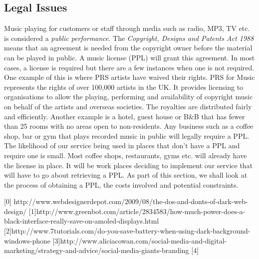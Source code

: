 \subsection{\textbf{Legal Issues}}
    Music playing for customers or staff through media such as radio, MP3, TV etc. is considered a \emph{public performance}. The \emph{Copyright, Designs and Patents Act 1988} means that an agreement is needed from the copyright owner before the material can be played in public. A music license (PPL) will grant this agreement. In most cases, a license is required but there are a few instances when one is not required. One example of this is where PRS  artists have waived their rights. PRS for Music represents the rights of over 100,000 artists in the UK.  It provides licensing to organisations to allow the playing, performing and availability of copyright music on behalf of the artists and overseas societies.  The royalties are distributed fairly and efficiently.  Another example is a hotel, guest house or B\&B that has fewer than 25 rooms with no areas open to non-residents. 
    Any business such as a coffee shop, bar or gym that plays recorded music in public will legally require a PPL. The likelihood of our service being used in places that don't have a PPL and require one is small. Most coffee shops, restaurants, gyms etc. will already have the license in place. It will be work places deciding to implement our service that will have to go about retrieving a PPL. As part of this section, we shall look at the process of obtaining a PPL, the costs involved and potential constraints.
    
    
    
    
    
    
    
    
    
    
    
    
    
    
    
    
    
    
    
[0] http://www.webdesignerdepot.com/2009/08/the-dos-and-donts-of-dark-web-design/
[1]http://www.greenbot.com/article/2834583/how-much-power-does-a-black-interface-really-save-on-amoled-displays.html
[2]http://www.7tutorials.com/do-you-save-battery-when-using-dark-background-windows-phone
[3]http://www.aliciacowan.com/social-media-and-digital-marketing/strategy-and-advice/social-media-giants-branding
[4]

























